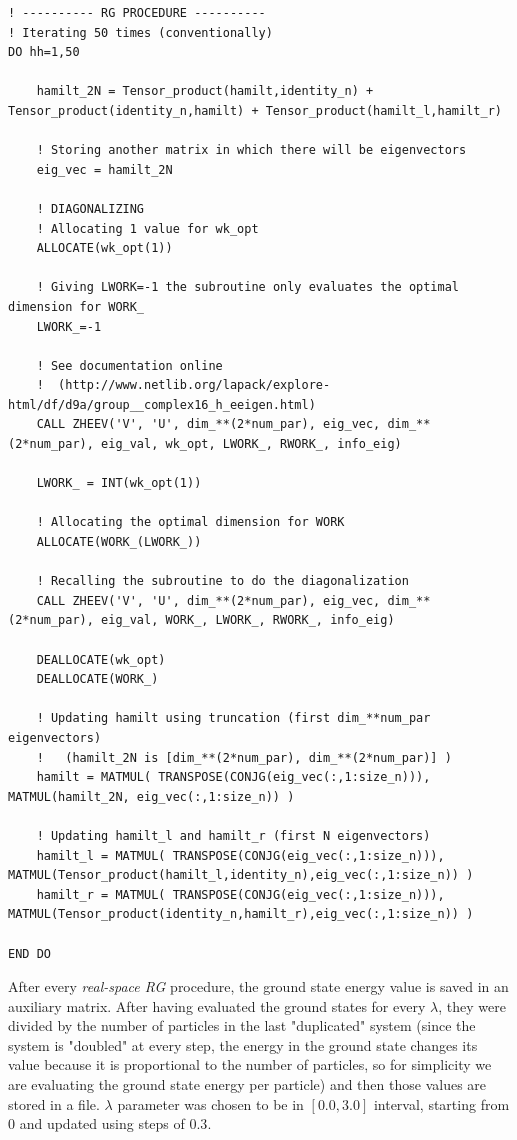 \documentclass[12pt, a4paper, notitlepage]{report}
\begin{document}
\begin{lstlisting}
! ---------- RG PROCEDURE ----------
! Iterating 50 times (conventionally)
DO hh=1,50

	hamilt_2N = Tensor_product(hamilt,identity_n) + Tensor_product(identity_n,hamilt) + Tensor_product(hamilt_l,hamilt_r)
	
	! Storing another matrix in which there will be eigenvectors
	eig_vec = hamilt_2N
	
	! DIAGONALIZING
	! Allocating 1 value for wk_opt
	ALLOCATE(wk_opt(1))
	
	! Giving LWORK=-1 the subroutine only evaluates the optimal dimension for WORK_
	LWORK_=-1
	
	! See documentation online
	!  (http://www.netlib.org/lapack/explore-html/df/d9a/group__complex16_h_eeigen.html) 
	CALL ZHEEV('V', 'U', dim_**(2*num_par), eig_vec, dim_**(2*num_par), eig_val, wk_opt, LWORK_, RWORK_, info_eig)
	
	LWORK_ = INT(wk_opt(1))
	
	! Allocating the optimal dimension for WORK
	ALLOCATE(WORK_(LWORK_))
	
	! Recalling the subroutine to do the diagonalization	
	CALL ZHEEV('V', 'U', dim_**(2*num_par), eig_vec, dim_**(2*num_par), eig_val, WORK_, LWORK_, RWORK_, info_eig)
	
	DEALLOCATE(wk_opt)
	DEALLOCATE(WORK_)
	
	! Updating hamilt using truncation (first dim_**num_par eigenvectors)
	!	(hamilt_2N is [dim_**(2*num_par), dim_**(2*num_par)] )
	hamilt = MATMUL( TRANSPOSE(CONJG(eig_vec(:,1:size_n))), MATMUL(hamilt_2N, eig_vec(:,1:size_n)) )
	
	! Updating hamilt_l and hamilt_r (first N eigenvectors)
	hamilt_l = MATMUL( TRANSPOSE(CONJG(eig_vec(:,1:size_n))), MATMUL(Tensor_product(hamilt_l,identity_n),eig_vec(:,1:size_n)) )
	hamilt_r = MATMUL( TRANSPOSE(CONJG(eig_vec(:,1:size_n))), MATMUL(Tensor_product(identity_n,hamilt_r),eig_vec(:,1:size_n)) )

END DO
\end{lstlisting}

After every \textit{real-space RG} procedure, the ground state energy value is saved in an auxiliary matrix. After having evaluated the ground states for every $\lambda$, they were divided by the number of particles in the last "duplicated" system (since the system is "doubled" at every step, the energy in the ground state changes its value because it is proportional to the number of particles, so for simplicity we are evaluating the ground state energy per particle) and then those values are stored in a file. $\lambda$ parameter was chosen to be in $[0.0, 3.0]$ interval, starting from $0$ and updated using steps of $0.3$.
\end{document}
